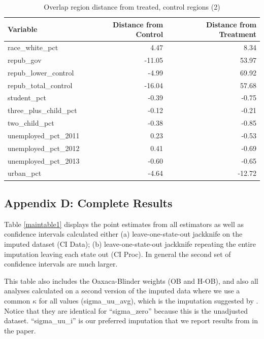 \documentclass[12pt]{article}
\begin{document}
\begin{table}[ht]
\centering
\begin{tabular}{lrr}
  \hline
Variable & Distance from Control & Distance from Treatment \\ 
  \hline
  race\_white\_pct & 4.47 & 8.34 \\ 
  repub\_gov & -11.05 & 53.97 \\ 
  repub\_lower\_control & -4.99 & 69.92 \\ 
  repub\_total\_control & -16.04 & 57.68 \\ 
  student\_pct & -0.39 & -0.75 \\ 
  three\_plus\_child\_pct & -0.12 & -0.21 \\ 
  two\_child\_pct & -0.38 & -0.85 \\ 
  unemployed\_pct\_2011 & 0.23 & -0.53 \\ 
  unemployed\_pct\_2012 & 0.41 & -0.69 \\ 
  unemployed\_pct\_2013 & -0.60 & -0.65 \\ 
  urban\_pct & -4.64 & -12.72 \\ 
   \hline
\end{tabular}
\caption{Overlap region distance from treated, control regions (2)}
\label{oatedist2}
\end{table}

\subsection{Appendix D: Complete Results}

Table \ref{maintable1} displays the point estimates from all estimators as well as confidence intervals calculated either (a) leave-one-state-out jackknife on the imputed dataset (CI Data); (b) leave-one-state-out jackknife repeating the entire imputation leaving each state out (CI Proc). In general the second set of confidence intervals are much larger. 

This table also includes the Oaxaca-Blinder weights (OB and H-OB), and also all analyses calculated on a second version of the imputed data where we use a common $\kappa$ for all values (sigma\_uu\_avg), which is the imputation suggested by \cite{carroll2006measurement}. Notice that they are identical for ``sigma\_zero'' because this is the unadjusted dataset. ``sigma\_uu\_i'' is our preferred imputation that we report results from in the paper.
\end{document}
